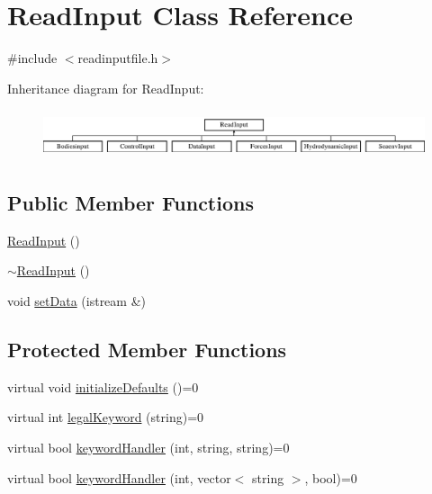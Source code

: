 \hypertarget{class_read_input}{\section{Read\-Input Class Reference}
\label{class_read_input}
}


{\ttfamily \#include $<$readinputfile.\-h$>$}

Inheritance diagram for Read\-Input\-:\begin{figure}[H]
\begin{center}
\leavevmode
\includegraphics[height=1.447028cm]{class_read_input}
\end{center}
\end{figure}
\subsection*{Public Member Functions}
\begin{DoxyCompactItemize}
\item 
\hyperlink{class_read_input_a181da3d718520ea9168808dde2d3e867}{Read\-Input} ()
\item 
\hyperlink{class_read_input_aec19e94e448ed46207c55412a61728fa}{$\sim$\-Read\-Input} ()
\item 
void \hyperlink{class_read_input_a0cebeb9dda7e4508fdc7a295229b8e07}{set\-Data} (istream \&)
\end{DoxyCompactItemize}
\subsection*{Protected Member Functions}
\begin{DoxyCompactItemize}
\item 
virtual void \hyperlink{class_read_input_a4ff2727b876cfd7c01299b08bdd65646}{initialize\-Defaults} ()=0
\item 
virtual int \hyperlink{class_read_input_a4c67f10e813686bf635dd4c6bb2c61bc}{legal\-Keyword} (string)=0
\item 
virtual bool \hyperlink{class_read_input_a1d8cb0ef59f265300b682de97513f48d}{keyword\-Handler} (int, string, string)=0
\item 
virtual bool \hyperlink{class_read_input_afb66a7ff67d0aeb10a3cfa5a4fbc31f8}{keyword\-Handler} (int, vector$<$ string $>$, bool)=0
\end{DoxyCompactItemize}


